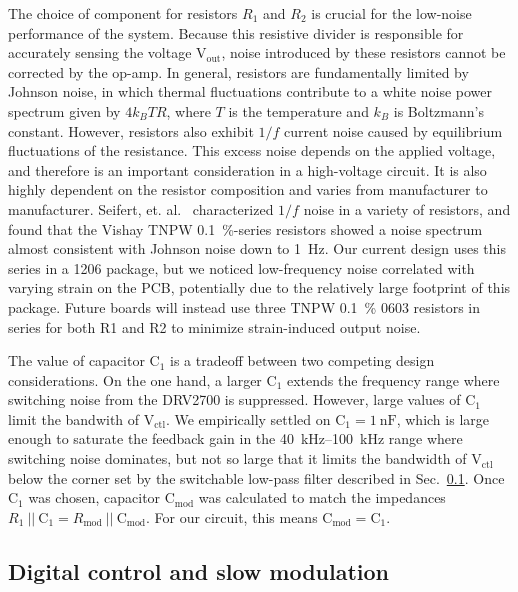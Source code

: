\documentclass[aip,rsi,reprint]{revtex4-1} %
\begin{document}
The choice of component for resistors $R_1$ and $R_2$ is crucial for the low-noise performance of the system. 
Because this resistive divider is responsible for accurately sensing the voltage $\text{V}_\text{out}$, noise introduced by these resistors cannot be corrected by the op-amp.
In general, resistors are fundamentally limited by Johnson noise, in which thermal fluctuations contribute to a white noise power spectrum given by $4 k_B T R$, where $T$ is the temperature and $k_B$ is Boltzmann's constant.\cite{Horowitz2015a:JN}
However, resistors also exhibit $1/f$ current noise caused by equilibrium fluctuations of the resistance.\cite{Clarke1974a,Voss1976a}
This excess noise depends on the applied voltage, and therefore is an important consideration in a high-voltage circuit.
It is also highly dependent on the resistor composition and varies from manufacturer to manufacturer.
Seifert, et. al.~\cite{Seifert2009a} characterized $1/f$ noise in a variety of resistors, and found that the Vishay TNPW \SI{0.1}{\percent}-series resistors showed a noise spectrum almost consistent with Johnson noise down to \SI{1}{\hertz}.
Our current design uses this series in a 1206 package, but we noticed low-frequency noise correlated with varying strain on the PCB, potentially due to the relatively large footprint of this package.
Future boards will instead use three TNPW \SI{0.1}{\percent} 0603 resistors in series for both R1 and R2 to minimize strain-induced output noise.

The value of capacitor $\text{C}_1$ is a tradeoff between two competing design considerations.
On the one hand, a larger $\text{C}_1$ extends the frequency range where switching noise from the DRV2700 is suppressed.
However, large values of $\text{C}_1$ limit the bandwith of $\text{V}_\text{ctl}$.
We empirically settled on $\text{C}_1 = \SI{1}{\nano\farad}$, which is large enough to saturate the feedback gain in the \SI{40}{\kilo\hertz}--\SI{100}{\kilo\hertz} range where switching noise dominates, but not so large that it limits the bandwidth of $\text{V}_\text{ctl}$ below the corner set by the switchable low-pass filter described in Sec.~\ref{Sec:SlowModulationMOS}.
Once $\text{C}_1$ was chosen, capacitor $\text{C}_\text{mod}$ was calculated to match the impedances $R_1~||~\text{C}_1 = R_\text{mod}~||~\text{C}_\text{mod}$.
For our circuit, this means $\text{C}_\text{mod} = \text{C}_1$.


\subsection{Digital control and slow modulation}
\label{Sec:SlowModulationMOS}
\end{document}
